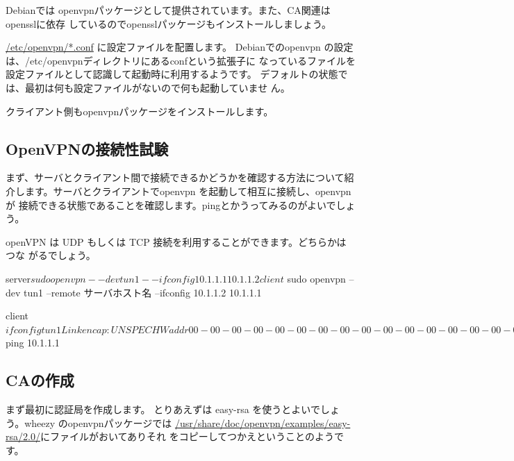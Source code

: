 \documentclass[mingoth,a4paper]{jsarticle}
\begin{document}
Debianでは openvpnパッケージとして提供されています。また、CA関連はopensslに依存
しているのでopensslパッケージもインストールしましょう。


\url{/etc/openvpn/*.conf} に設定ファイルを配置します。 Debianでのopenvpn
の設定は、/etc/openvpnディレクトリにあるconfという拡張子に
なっているファイルを設定ファイルとして認識して起動時に利用するようです。
デフォルトの状態では、最初は何も設定ファイルがないので何も起動していませ
ん。

クライアント側もopenvpnパッケージをインストールします。

\subsection{OpenVPNの接続性試験}

まず、サーバとクライアント間で接続できるかどうかを確認する方法について紹
介します。サーバとクライアントでopenvpn を起動して相互に接続し、openvpnが
接続できる状態であることを確認します。pingとかうってみるのがよいでしょう。

openVPN は UDP もしくは TCP 接続を利用することができます。どちらかはつな
がるでしょう。

\begin{commandline}
 server$ sudo openvpn --dev tun1 --ifconfig 10.1.1.1 10.1.1.2
 client$ sudo openvpn --dev tun1 --remote サーバホスト名 --ifconfig 10.1.1.2 10.1.1.1

 client$ ifconfig
 tun1      Link encap:UNSPEC  HWaddr 00-00-00-00-00-00-00-00-00-00-00-00-00-00-00-00
          inet addr:10.1.1.2  P-t-P:10.1.1.1  Mask:255.255.255.255
          UP POINTOPOINT RUNNING NOARP MULTICAST  MTU:1500  Metric:1
          RX packets:2 errors:0 dropped:0 overruns:0 frame:0
          TX packets:2 errors:0 dropped:0 overruns:0 carrier:0
          collisions:0 txqueuelen:100
          RX bytes:168 (168.0 B)  TX bytes:168 (168.0 B)
 client$ ping 10.1.1.1

\end{commandline}

\subsection{CAの作成}

まず最初に認証局を作成します。
とりあえずは easy-rsa を使うとよいでしょう。wheezy のopenvpnパッケージでは
\url{/usr/share/doc/openvpn/examples/easy-rsa/2.0/}にファイルがおいてありそれ
をコピーしてつかえということのようです。
\end{document}

